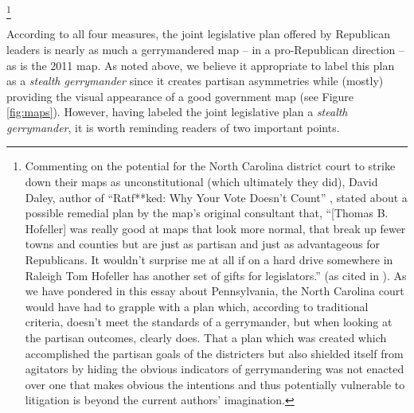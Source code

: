         \footnote{Commenting on the potential for the North Carolina district court to strike down their maps as unconstitutional (which ultimately they did), David Daley, author of ``Ratf**ked: Why Your Vote Doesn't Count'' \cite{Daley2016_ratf**ked}, stated about a possible remedial plan by the map's original consultant that, ``[Thomas B. Hofeller] was really good at maps that look more normal, that break up fewer towns and counties but are just as partisan and just as advantageous for Republicans. It wouldn’t surprise me at all if on a hard drive somewhere in Raleigh Tom Hofeller has another set of gifts for legislators.'' (as cited in \citet{Barnett2018_NC_gerry}). As we have pondered in this essay about Pennsylvania, the North Carolina court would have had to grapple with a plan which, according to traditional criteria, doesn't meet the standards of a gerrymander, but when looking at the partisan outcomes, clearly does. That a plan which was created which accomplished the partisan goals of the districters but also shielded itself from agitators by hiding the obvious indicators of gerrymandering was not enacted over one that makes obvious the intentions and thus potentially vulnerable to litigation is beyond the current authors' imagination.}
\par
    According to all four measures, the joint legislative plan offered by Republican leaders is nearly as much a gerrymandered map -- in a pro-Republican direction -- as is the 2011 map. As noted above, we believe it appropriate to label this plan as a \textit{stealth gerrymander} since it creates partisan asymmetries while (mostly) providing the visual appearance of a good government map (see Figure \ref{fig:maps}). However, having labeled the joint legislative plan a \textit{stealth gerrymander}, it is worth reminding readers of two important points. 
\par
